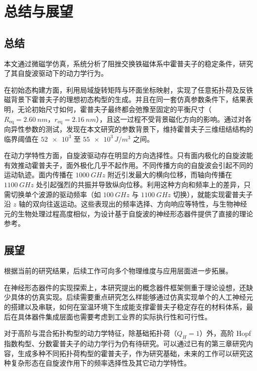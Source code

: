\chapter{总结与展望}

\section{总结}

本文通过微磁学仿真，系统分析了阻挫交换铁磁体系中霍普夫子的稳定条件，研究了其自旋波驱动下的动力学行为。

在初始态构建方面，利用局域旋转矩阵与环面坐标映射，实现了任意拓扑荷及反铁磁背景下霍普夫子的理想初态构型的生成。并且在同一套仿真参数条件下，结果表明，无论初始尺寸如何，霍普夫子最终都会弛豫至固定的平衡尺寸（$R_{\text{eq}} = \SI{2.60}{nm}$，$r_{\text{eq}} = \SI{2.16}{nm}$），且这一过程不受背景磁化方向的影响。通过对各向异性参数的测试，发现在本文研究的参数背景下，维持霍普夫子三维纽结结构的临界阈值在 $\num{52e3}$ 至 $\num{55e3} \, \si{J/m^3}$ 之间。

在动力学特性方面，自旋波驱动存在明显的方向选择性。只有面内极化的自旋波能有效推动霍普夫子，面外极化几乎不起作用。不同传播方向的自旋波会引起不同的运动轨迹。面内传播在 $\SI{1000}{GHz}$ 附近引发最大的横向位移，而轴向传播在 $\SI{1100}{GHz}$ 处引起强烈的共振并导致纵向位移。利用这种方向和频率上的差异，只需切换单个波源的驱动频率（如 $\SI{100}{GHz}$ 与 $\SI{1100}{GHz}$ 切换），就能实现霍普夫子沿 $z$ 轴的双向往返运动。这些表现出的频率选择、方向响应等特性，与生物神经元的生物处理过程高度相似，为设计基于自旋波的神经形态器件提供了直接的理论参考。


\section{展望}

根据当前的研究结果，后续工作可向多个物理维度与应用层面进一步拓展。

在神经形态器件的实现探索上，本研究提出的概念器件框架侧重于理论设想，还缺少具体的仿真实现。后续需要重点研究怎么样能够通过仿真实现单个的人工神经元的搭建以及串联，如何在室温环境下生成能支撑霍普夫子稳定存在的材料体系，最后在具体器件集成层面也需要考虑到工业界的实际执行性和可行性。

对于高阶与混合拓扑构型的动力学特征，除基础拓扑荷（$Q_H = 1$）外，高阶 Hopf 指数构型、分数霍普夫子的动力学行为仍有待研究。可以通过已有的第三章研究内容，生成多种不同拓扑荷构型的霍普夫子，作为研究基础，未来的工作可以研究这种复杂形态在自旋波作用下的频率选择性及其它动力学特性。

